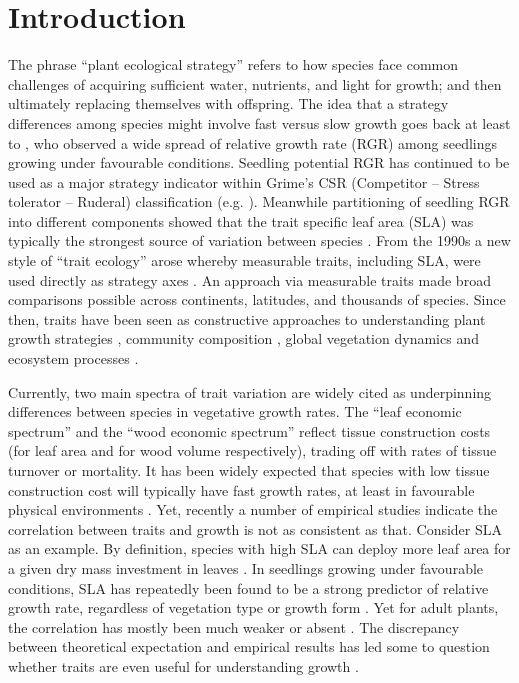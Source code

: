 \documentclass[a4paper,11pt]{article}
\begin{document}
\section*{Introduction}\label{introduction}

The phrase ``plant ecological strategy'' refers to how species face common challenges of acquiring sufficient water, nutrients, and light for growth; and then ultimately replacing themselves with offspring. The idea that a strategy differences among species might involve fast versus slow growth goes back at least to \citet{Grime:1975gr}, who observed a wide spread of relative growth rate (RGR) among seedlings growing under favourable conditions. Seedling potential RGR has continued to be used as a major strategy indicator within Grime's CSR (Competitor -- Stress tolerator -- Ruderal) classification (e.g. \citealt{grime1979plant, Grime:1997wm}). Meanwhile partitioning of seedling RGR into different components showed that the trait specific leaf area (SLA) was typically the strongest source of variation between species \citep{Poorter:1989tx, Rees:2010gk}. From the 1990s a new style of ``trait ecology'' arose whereby measurable traits, including SLA, were used directly as strategy axes \citep{Westoby:2002ft}. An approach via measurable traits made broad comparisons possible across continents, latitudes, and thousands of species. Since then, traits have been seen as constructive approaches to understanding plant growth strategies \citep{Westoby:2002ft}, community composition \citep{Lavorel:2002ff,Shipley:2006ie}, global vegetation dynamics \citep{Scheiter:2013ed} and ecosystem processes \citep{Lavorel:2002ff}.

Currently, two main spectra of trait variation are widely cited as underpinning differences between species in vegetative growth rates. The ``leaf economic spectrum'' \citep{Wright:2004jb} and the ``wood economic spectrum'' \citep{Chave:2009iy} reflect tissue construction costs (for leaf area and for wood volume respectively), trading off with rates of tissue turnover or mortality. It has been widely expected that species with low tissue construction cost will typically have fast growth rates, at least in favourable physical environments \citep[e.g.][]{MullerLandau:2004dc,Poorter:2008iu,Chave:2009iy,Larjavaara:2010bn,Iida:2012jb,Paine:2015df}. Yet, recently a number of empirical studies indicate the correlation between traits and growth is not as consistent as that. Consider SLA as an example. By definition, species with high SLA can deploy more leaf area for a given dry mass investment in leaves \citep{Poorter:1999wd, Reich:1992wm}. In seedlings growing under favourable conditions, SLA has repeatedly been found to be a strong predictor of relative growth rate, regardless of vegetation type or growth form \citep{Lambers:1992bj,Reich:1992wm,Grime:1997wm,Poorter:1999wd,Wright:1999ds}. Yet for adult plants, the correlation has mostly been much weaker or absent \citep{coomes_comparison_1998,Poorter:2008iu,Aiba:2009ft,Easdale:2009gv,Wright:2010tp}. The discrepancy between theoretical expectation and empirical results has led some to question whether traits are even useful for understanding growth \citep{Wright:2010tp, Paine:2015df}.
\end{document}
